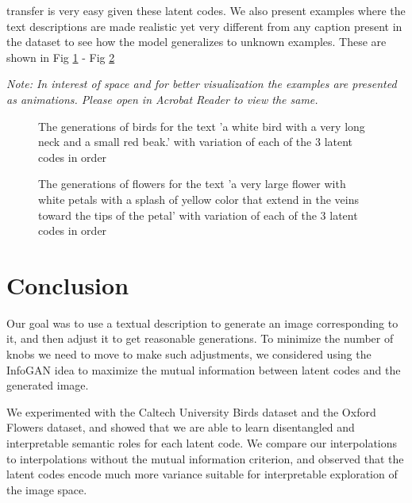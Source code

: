 \documentclass{article}
\begin{document}
transfer is very easy
given these latent codes. We also present examples where the text descriptions
are made realistic yet very different from any caption present in the dataset to
see how the model generalizes to unknown examples. These are shown in Fig
\ref{animation} - Fig \ref{animation_flower}

\textit{Note: In interest of space and for better visualization the examples are
presented as animations. Please open in Acrobat Reader to view the same.}
\begin{figure}
\caption{The generations of birds for the text 'a white bird with a very long
neck and a small red beak.' with variation of each of the 3 latent codes in
order}
\label{animation}
\end{figure}
\begin{figure}
\caption{The generations of flowers for the text 'a very large flower with white petals with a splash of yellow color that extend in the veins toward the tips of the petal' with
    variation of each of the 3 latent codes in
order}
\label{animation_flower}
\end{figure}
\section{Conclusion}

Our goal was to use a textual description to generate an image corresponding to it, and then adjust it to get reasonable generations. To minimize the number of knobs we need to move to make such adjustments, we considered using the InfoGAN idea to maximize the mutual information between latent codes and the generated image.

We experimented with the Caltech University Birds dataset and the Oxford Flowers dataset, and showed that we are able to learn disentangled and interpretable semantic roles for each latent code. We compare our interpolations to interpolations without the mutual information criterion, and observed that the latent codes encode much more variance suitable for interpretable exploration of the image space.
\end{document}
